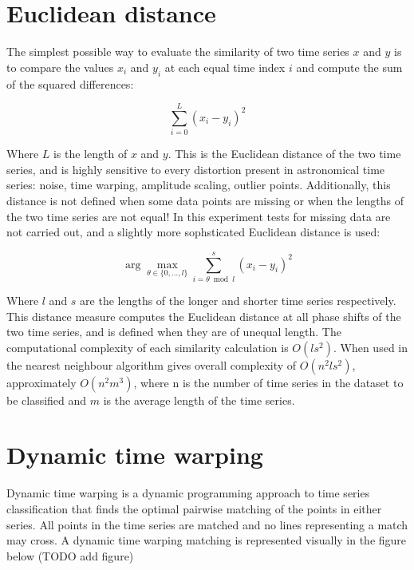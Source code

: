 \documentclass[10pt]{article}
\begin{document}
	\section{Euclidean distance}
		The simplest possible way to evaluate the similarity of two time series $x$ and $y$ is to compare the values $x_{i}$ and $y_{i}$ at each equal time index $i$ and compute the sum of the squared differences:
		
		\begin{equation}
			\sum\limits_{i = 0}^{L}(x_{i} - y_{i})^{2}
		\end{equation}
	
	Where $L$ is the length of $x$ and $y$. This is the Euclidean distance of the two time series, and is highly sensitive to every distortion present in astronomical time series: noise, time warping, amplitude scaling, outlier points. Additionally, this distance is not defined when some data points are missing or when the lengths of the two time series are not equal! In this experiment tests for missing data are not carried out, and a slightly more sophsticated Euclidean distance is used:
	
	\begin{equation}
		\arg\max\limits_{\theta \in \{0, \ldots, l\}}\sum\limits_{i = \theta \bmod l}^{s}(x_{i} - y_{i})^{2}
	\end{equation}
	
	Where $l$ and $s$ are the lengths of the longer and shorter time series respectively. This distance measure computes the Euclidean distance at all phase shifts of the two time series, and is defined when they are of unequal length. The computational complexity of each similarity calculation is $O(ls^{2})$. When used in the nearest neighbour algorithm gives overall complexity of $O(n^{2}ls^{2})$, approximately $O(n^{2}m^{3})$, where n is the number of time series in the dataset to be classified and $m$ is the average length of the time series.
	
	\section{Dynamic time warping}
	Dynamic time warping is a dynamic programming approach to time series classification that finds the optimal pairwise matching of the points in either series. All points in the time series are matched and no lines representing a match may cross. A dynamic time warping matching is represented visually in the figure below (TODO add figure)
	
\end{document}
